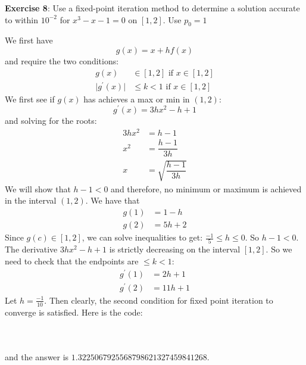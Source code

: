 \documentclass{article}
\begin{document}
\textbf{Exercise 8}: Use a fixed-point iteration method to determine a solution accurate to within $10^{-2}$ for $x^{3} - x - 1 = 0$ on $[1, 2]$. Use $p_{0} = 1$
    \begin{answer}
        We first have 
            \begin{equation*}
                g(x) = x + hf(x)
            \end{equation*}
        and require the two conditions:
            \begin{align*}
                g(x)                        &\in                                 [1, 2] \text{ if } x \in [1, 2] \\
                \lvert g^{\prime}(x) \rvert &\leq k < 1 \text{ if } x \in [1, 2]                                   
            \end{align*}
        We first see if $g(x)$ has achieves a max or min in $(1, 2)$:
            \begin{equation*}
                g^{\prime}(x) = 3hx^{2} - h + 1
            \end{equation*}
        and solving for the roots:
            \begin{align*}
                3hx^{2} &= h - 1                    \\
                x^{2}   &= \dfrac{h - 1}{3h}        \\
                x       &= \sqrt{\dfrac{h - 1}{3h}}   
            \end{align*}
        We will show that $h - 1 < 0$ and therefore, no minimum or maximum is achieved in the interval $(1, 2)$. We have that 
            \begin{align*}
                g(1) &= 1 - h  \\
                g(2) &= 5h + 2   
            \end{align*}
        Since $g(c) \in [1, 2]$, we can solve inequalities to get: $\frac{-1}{5} \leq h \leq 0$. So $h - 1 < 0$. The derivative $3hx^{2} - h + 1$ is strictly decreasing on the interval $[1, 2]$. So we need to check that the endpoints are $\leq k < 1$:
            \begin{align*}
                g^{\prime}(1) &= 2h + 1  \\
                g^{\prime}(2) &= 11h + 1   
            \end{align*}
        Let $h = \frac{-1}{10}$. Then clearly, the second condition for fixed point iteration to converge is satisfied. Here is the code:
            \inputminted{matlab}{fixed_point/myfunc1.m}
            \inputminted{matlab}{fixed_point/fixed_point.m}
            \inputminted{matlab}{fixed_point/script.m}
        and the answer is $1.3225067925568798621327459841268$.
    \end{answer}
\end{document}
